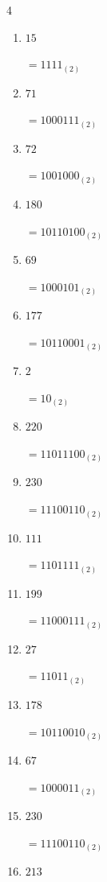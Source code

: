 \begin{multicols}{4}
\begin{enumerate}
        $=10011110_{(2)}$

  \item $15$

        $=1111_{(2)}$

  \item $71$

        $=1000111_{(2)}$

  \item $72$

        $=1001000_{(2)}$

  \item $180$

        $=10110100_{(2)}$

  \item $69$

        $=1000101_{(2)}$

  \item $177$

        $=10110001_{(2)}$

  \item $2$

        $=10_{(2)}$

  \item $220$

        $=11011100_{(2)}$

  \item $230$

        $=11100110_{(2)}$

\columnbreak %

\resetques

  \item $111$

        $=1101111_{(2)}$

  \item $199$

        $=11000111_{(2)}$

  \item $27$

        $=11011_{(2)}$

  \item $178$

        $=10110010_{(2)}$

  \item $67$

        $=1000011_{(2)}$

  \item $230$

        $=11100110_{(2)}$

  \item $213$


\end{enumerate}
\end{multicols}
